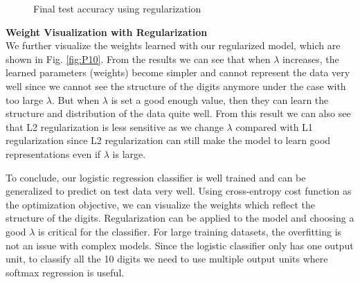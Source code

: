 \documentclass{article} %
\begin{document}
\begin{figure}%
	\centering
	\qquad
	\caption{Final test accuracy using regularization}%
	\label{fig:P9}%
\end{figure}

\textbf{Weight Visualization with Regularization}\\
We further visualize the weights learned with our regularized model, which are shown in Fig. \ref{fig:P10}. From the results we can see that when $\lambda$ increases, the learned parameters (weights) become simpler and cannot represent the data very well since we cannot see the structure of the digits anymore under the case with too large $\lambda$. But when $\lambda$ is set a good enough value, then they can learn the structure and distribution of the data quite well. From this result we can also see that L2 regularization is less sensitive as we change $\lambda$ compared with L1 regularization since L2 regularization can still make the model to learn good representations even if $\lambda$ is large.

To conclude, our logistic regression classifier is well trained and can be generalized to predict on test data very well. Using cross-entropy cost function as the optimization objective, we can visualize the weights which reflect the structure of the digits. Regularization can be applied to the model and choosing a good $\lambda$ is critical for the classifier. For large training datasets, the overfitting is not an issue with complex models. Since the logistic classifier only has one output unit, to classify all the 10 digits we need to use multiple output units where softmax regression is useful.
\end{document}
